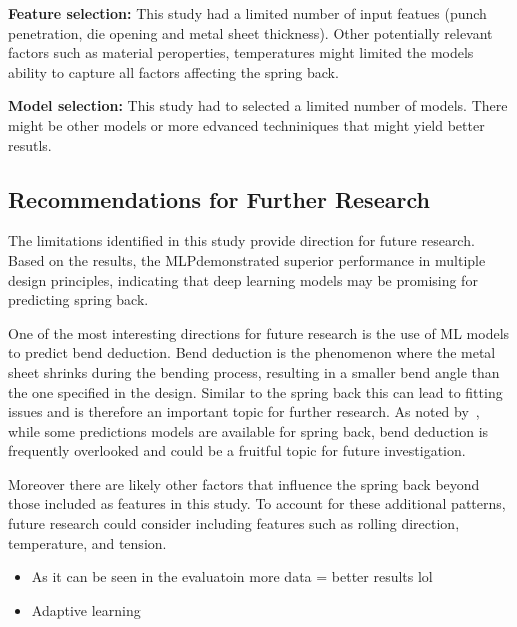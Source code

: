 \textbf{Feature selection:} This study had a limited number of input featues (punch penetration, die opening and
metal sheet thickness).
Other potentially relevant factors such as material peroperties, temperatures might limited the models ability to
capture all factors affecting the spring back.

\textbf{Model selection:} This study had to selected a limited number of models.
There might be other models or more edvanced techniniques that might yield better resutls.

\subsection{Recommendations for Further Research}\label{subsec:recommendations-for-further-research}
The limitations identified in this study provide direction for future research.
Based on the results, the \ac{MLP}demonstrated superior performance in multiple design principles, indicating that
deep learning models may be promising for predicting spring back.



One of the most interesting directions for future research is the use of \ac{ML} models to predict bend deduction.
Bend deduction is the phenomenon where the metal sheet shrinks during the bending process, resulting in a smaller
bend angle than the one specified in the design.
Similar to the spring back this can lead to fitting issues and is therefore an important topic for further research.
As noted by~\cite{strano2017fusion}, while some predictions models are available for spring back, bend deduction is
frequently overlooked and could be a fruitful topic for future investigation.

Moreover there are likely other factors that influence the spring back beyond those included as features in this study.
To account for these additional patterns, future research could consider including features such as rolling
direction, temperature, and tension.

\begin{itemize}
    \item As it can be seen in the evaluatoin more data = better results lol
    \item Adaptive learning
\end{itemize}



